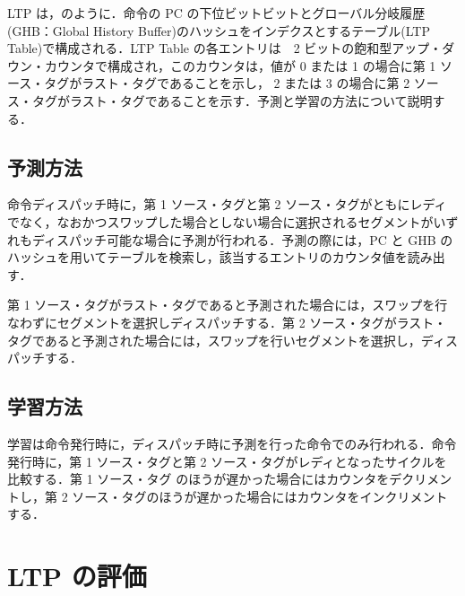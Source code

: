 LTP は，のように．命令の PC の下位ビットビットとグローバル分岐履歴(GHB：Global History Buffer)のハッシュをインデクスとするテーブル(LTP Table)で構成される．LTP Table の各エントリは　2 ビットの飽和型アップ・ダウン・カウンタで構成され，このカウンタは，値が 0 または 1 の場合に第 1 ソース・タグがラスト・タグであることを示し， 2 または 3 の場合に第 2 ソース・タグがラスト・タグであることを示す．予測と学習の方法について説明する．
  
\subsection{予測方法}
命令ディスパッチ時に，第 1 ソース・タグと第 2 ソース・タグがともにレディでなく，なおかつスワップした場合としない場合に選択されるセグメントがいずれもディスパッチ可能な場合に予測が行われる．予測の際には，PC と GHB のハッシュを用いてテーブルを検索し，該当するエントリのカウンタ値を読み出す．

第 1 ソース・タグがラスト・タグであると予測された場合には，スワップを行なわずにセグメントを選択しディスパッチする．第 2 ソース・タグがラスト・タグであると予測された場合には，スワップを行いセグメントを選択し，ディスパッチする．
  

\subsection{学習方法}
学習は命令発行時に，ディスパッチ時に予測を行った命令でのみ行われる．命令発行時に，第 1 ソース・タグと第 2 ソース・タグがレディとなったサイクルを比較する．第 1 ソース・タグ のほうが遅かった場合にはカウンタをデクリメントし，第 2 ソース・タグのほうが遅かった場合にはカウンタをインクリメントする．

\section{LTP の評価}